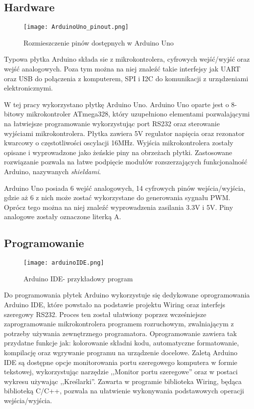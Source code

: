 \subsection{Hardware}%
\begin{figure}[H]
	\centering
	\texttt{[image: ArduinoUno\_pinout.png]}
	\caption{Rozmieszczenie pinów dostępnych w Arduino Uno}
\end{figure}
Typowa płytka Arduino składa sie z mikrokontrolera, cyfrowych wejść/wyjść oraz wejść analogowych. Poza tym można na niej znaleźć takie interfejsy jak UART oraz USB do połączenia z komputerem, SPI i I2C do komunikacji z urządzeniami elektronicznymi.

W tej pracy wykorzystano płytkę Arduino Uno. Arduino Uno oparte jest o 8-bitowy mikrokontroler ATmega328, który uzupełniono elementami pozwalającymi na łatwiejsze programowanie wykorzystując port RS232 oraz sterowanie wyjściami mikrokontrolera. Płytka zawiera 5V regulator napięcia oraz rezonator kwarcowy o częstotliwości oscylacji 16MHz. Wyjścia mikrokontrolera zostały opisane i wyprowadzone jako żeńskie piny na obrzeżach płytki. Zastosowane rozwiązanie pozwala na łatwe podpięcie modułów rozszerzających funkcjonalność Arduino, nazywanych \textit{shieldami}. 

Arduino Uno posiada 6 wejść analogowych, 14 cyfrowych pinów wejścia/wyjścia, gdzie aż 6 z nich może zostać wykorzystane do generowania sygnału PWM. Oprócz tego można na niej znaleźć wyprowadzenia zasilania 3.3V i 5V. Piny analogowe zostały oznaczone literką A.
\newpage
\subsection{Programowanie}%
\begin{figure}[H]
	\centering
	\texttt{[image: arduinoIDE.png]}
	\caption{Arduino IDE- przykładowy program}
	\label{ArduinoPodstawoweFunkcje}
\end{figure}
Do programowania płytek Arduino wykorzystuje się dedykowane oprogramowania Arduino IDE, które powstało na podstawie projektu Wiring oraz interfejs szeregowy RS232. Proces ten został ułatwiony poprzez wcześniejsze zaprogramowanie mikrokontrolera programem rozruchowym, zwalniającym z potrzeby używania zewnętrznego programatora. Oprogramowanie zawiera tak przydatne funkcje jak: kolorowanie składni kodu, automatyczne formatowanie, kompilację oraz wgrywanie programu na urządzenie docelowe. Zaletą Arduino IDE są dostępne opcje monitorowania portu szeregowego komputera w formie tekstowej, wykorzystując narzędzie ,,Monitor portu szeregowe'' oraz w postaci wykresu używając ,,Kreślarki''. Zawarta w programie biblioteka Wiring, będąca biblioteką C/C++, pozwala na ułatwienie wykonywania podstawowych operacji wejścia/wyjścia.

